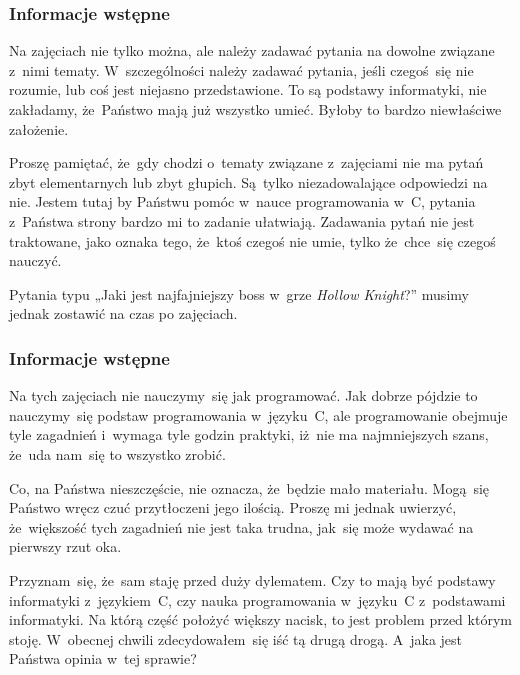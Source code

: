 \documentclass[10pt,t]{beamer}
\begin{document}
\begin{frame}
  \frametitle{Informacje wstępne}


  Na zajęciach nie tylko można, ale \alert{należy} zadawać pytania
  na dowolne związane z~nimi tematy. W~szczególności
  \alert{należy} zadawać pytania, jeśli czegoś~się nie rozumie, lub coś
  jest niejasno przedstawione. To są podstawy informatyki, \alert{nie}
  zakładamy, że~Państwo mają już wszystko umieć. Byłoby to bardzo
  niewłaściwe założenie.

  Proszę pamiętać, że~gdy chodzi o~tematy związane z~zajęciami
  \alert{nie} ma pytań zbyt elementarnych lub zbyt głupich. Są~tylko
  niezadowalające odpowiedzi na nie. Jestem tutaj by Państwu
  pomóc w~nauce programowania w~C, pytania z~Państwa strony bardzo mi to
  zadanie ułatwiają. Zadawania pytań nie jest traktowane, jako oznaka tego,
  że~ktoś czegoś nie umie, tylko że~chce~się czegoś nauczyć.

  Pytania typu „Jaki jest najfajniejszy boss w~grze \textit{Hollow
    Knight}?” musimy jednak zostawić na czas po zajęciach.

\end{frame}





\begin{frame}
  \frametitle{Informacje wstępne}


  Na tych zajęciach \alert{nie} nauczymy~się jak programować. Jak dobrze
  pójdzie to nauczymy~się podstaw programowania w~języku~C, ale
  programowanie obejmuje tyle zagadnień i~wymaga tyle godzin praktyki,
  iż~nie ma najmniejszych szans, że~uda nam~się to wszystko zrobić.

  Co, na Państwa nieszczęście, nie oznacza, że~będzie mało materiału.
  Mogą~się Państwo wręcz czuć przytłoczeni jego ilością. Proszę mi jednak
  uwierzyć, że~większość tych zagadnień nie jest taka trudna, jak~się
  może wydawać na pierwszy rzut oka.

  Przyznam~się, że~sam staję przed duży dylematem. Czy to mają być
  \alert{podstawy informatyki} z~językiem~C, czy \alert{nauka
    programowania w~języku~C} z~podstawami informatyki. Na którą część
  położyć większy nacisk, to jest problem przed którym stoję. W~obecnej
  chwili zdecydowałem~się iść tą drugą drogą. A~jaka jest Państwa opinia
  w~tej sprawie?

\end{frame}
\end{document}
